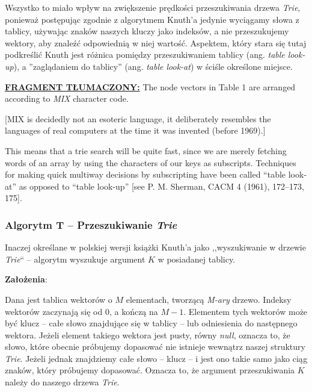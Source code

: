     Wszystko to miało wpływ na zwiększenie prędkości przeszukiwania drzewa \emph{Trie}, ponieważ postępując zgodnie z algorytmem Knuth'a jedynie wyciągamy słowa z tablicy, używając znaków naszych kluczy jako indeksów, a nie przeszukujemy wektory, aby znaleźć odpowiednią w niej wartość. Aspektem, który stara się tutaj podkreślić Knuth jest różnica pomiędzy przeszukiwaniem tablicy (ang. \emph{table look-up}), a ''zaglądaniem do tablicy'' (ang. \emph{table look-at}) w ściśle określone miejsce.
	
	\ifsourcematerial
	\begin{displayquote}
		\color{ao(english)}
		\underline{\textbf{FRAGMENT TŁUMACZONY:}} \newline
		The node vectors in Table 1 are arranged according to \emph{MIX} character code. 
		
		[MIX is decidedly not an esoteric language, it deliberately resembles the languages of real computers at the time it was invented (before 1969).] 
		
		This means that a trie search will be quite fast, since we are merely fetching words of an array by using the characters of our keys as subscripts. Techniques
		for making quick multiway decisions by subscripting have been called “table
		look-at” as opposed to “table look-up” [see P. M. Sherman, CACM 4 (1961),
		172–173, 175].
	\end{displayquote}
	\fi
	
	\subsubsection{Algorytm T -- Przeszukiwanie \emph{Trie}}\label{sec:AlgorytmT}
	
	Inaczej określane w polskiej wersji książki Knuth'a jako ,,wyszukiwanie w drzewie \emph{Trie}`` -- algorytm wyszukuje argument $K$ w posiadanej tablicy.
	
	\textbf{Założenia}: 
	
    Dana jest tablica wektorów o $M$ elementach, tworzącą \emph{M-ary} drzewo. Indeksy wektorów zaczynają się od $0$, a kończą na $M-1$. Elementem tych wektorów może być klucz -- całe słowo znajdujące się w tablicy -- lub odniesienia do następnego wektora. Jeżeli element takiego wektora jest pusty, równy \emph{null}, oznacza to, że słowo, które obecnie próbujemy dopasować nie istnieje wewnątrz naszej struktury \emph{Trie}. Jeżeli jednak znajdziemy całe słowo -- klucz -- i jest ono takie samo jako ciąg znaków, który próbujemy dopasować. Oznacza to, że argument przeszukiwania $K$ należy do naszego drzewa \emph{Trie}.
		
